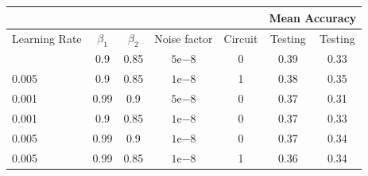 \begin{table}[]
    \centering
    \begin{tabular}{lcccc|cc|}
\cline{6-7}
                                                    &                                                  &                                                   &                                                                &         & \multicolumn{2}{c|}{Mean Accuracy}                          \\ \hline
\multicolumn{1}{|l|}{Learning Rate}                 & \multicolumn{1}{c|}{$\beta_1$}                   & \multicolumn{1}{c|}{$\beta_2$}                    & \multicolumn{1}{c|}{Noise factor}                              & Circuit & \multicolumn{1}{c|}{Testing}                      & Testing \\ \hline
\rowcolor[HTML]{FFFE65} 
\multicolumn{1}{|l|}{\cellcolor[HTML]{FFFE65}0.005} & \multicolumn{1}{c|}{\cellcolor[HTML]{FFFE65}0.9} & \multicolumn{1}{c|}{\cellcolor[HTML]{FFFE65}0.85} & \multicolumn{1}{c|}{\cellcolor[HTML]{FFFE65}$5\mathrm{e}{-8}$} & 0       & \multicolumn{1}{c|}{\cellcolor[HTML]{FFFE65}0.39} & 0.33    \\ \hline
\multicolumn{1}{|l|}{0.005}                         & \multicolumn{1}{c|}{0.9}                         & \multicolumn{1}{c|}{0.85}                         & \multicolumn{1}{c|}{$1\mathrm{e}{-8}$}                         & 1       & \multicolumn{1}{c|}{0.38}                         & 0.35    \\ \hline
\multicolumn{1}{|l|}{0.001}                         & \multicolumn{1}{c|}{0.99}                        & \multicolumn{1}{c|}{0.9}                          & \multicolumn{1}{c|}{$5\mathrm{e}{-8}$}                         & 0       & \multicolumn{1}{c|}{0.37}                         & 0.31    \\ \hline
\multicolumn{1}{|l|}{0.001}                         & \multicolumn{1}{c|}{0.9}                         & \multicolumn{1}{c|}{0.85}                         & \multicolumn{1}{c|}{$1\mathrm{e}{-8}$}                         & 0       & \multicolumn{1}{c|}{0.37}                         & 0.33    \\ \hline
\multicolumn{1}{|l|}{0.005}                         & \multicolumn{1}{c|}{0.99}                        & \multicolumn{1}{c|}{0.9}                          & \multicolumn{1}{c|}{$1\mathrm{e}{-8}$}                         & 0       & \multicolumn{1}{c|}{0.37}                         & 0.34    \\ \hline
\multicolumn{1}{|l|}{0.005}                         & \multicolumn{1}{c|}{0.99}                        & \multicolumn{1}{c|}{0.85}                         & \multicolumn{1}{c|}{$1\mathrm{e}{-8}$}                         & 1       & \multicolumn{1}{c|}{0.36}                         & 0.34    \\ \hline

\end{tabular}
\end{table}
